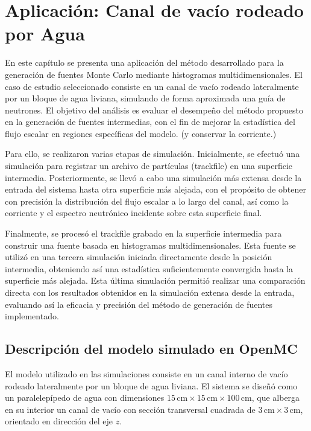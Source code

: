 \chapter{Aplicación: Canal de vacío rodeado por Agua}

En este capítulo se presenta una aplicación del método desarrollado para la generación de fuentes Monte Carlo mediante histogramas multidimensionales. El caso de estudio seleccionado consiste en un canal de vacío rodeado lateralmente por un bloque de agua liviana, simulando de forma aproximada una guía de neutrones. El objetivo del análisis es evaluar el desempeño del método propuesto en la generación de fuentes intermedias, con el fin de mejorar la estadística del flujo escalar en regiones específicas del modelo. (y conservar la corriente.)

Para ello, se realizaron varias etapas de simulación. Inicialmente, se efectuó una simulación para registrar un archivo de partículas (trackfile) en una superficie intermedia. Posteriormente, se llevó a cabo una simulación más extensa desde la entrada del sistema hasta otra superficie más alejada, con el propósito de obtener con precisión la distribución del flujo escalar a lo largo del canal, así como la corriente y el espectro neutrónico incidente sobre esta superficie final.

Finalmente, se procesó el trackfile grabado en la superficie intermedia para construir una fuente basada en histogramas multidimensionales. Esta fuente se utilizó en una tercera simulación iniciada directamente desde la posición intermedia, obteniendo así una estadística suficientemente convergida hasta la superficie más alejada. Esta última simulación permitió realizar una comparación directa con los resultados obtenidos en la simulación extensa desde la entrada, evaluando así la eficacia y precisión del método de generación de fuentes implementado.

\section{Descripción del modelo simulado en OpenMC}

El modelo utilizado en las simulaciones consiste en un canal interno de vacío rodeado lateralmente por un bloque de agua liviana. El sistema se diseñó como un paralelepípedo de agua con dimensiones $15\,\text{cm} \times 15\,\text{cm} \times 100\,\text{cm}$, que alberga en su interior un canal de vacío con sección transversal cuadrada de $3\,\text{cm} \times 3\,\text{cm}$, orientado en dirección del eje $z$.

